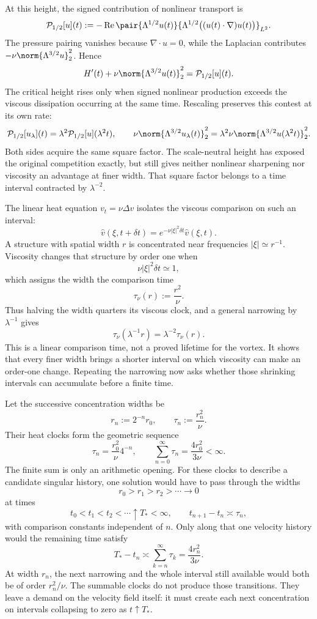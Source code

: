 
At this height, the signed contribution of nonlinear transport is
\[
  \mathcal P_{1/2}[u](t)
  :=
  -\operatorname{Re}
  \pair
    {\Lambda^{1/2}u(t)}
    {\Lambda^{1/2}\bigl((u(t)\cdot\nabla)u(t)\bigr)}_{L^2}.
\]
The pressure pairing vanishes because \(\nabla\cdot u=0\), while the Laplacian contributes \(-\nu\norm{\Lambda^{3/2}u}_2^2\). Hence
\[
  H'(t)
  +
  \nu\norm{\Lambda^{3/2}u(t)}_2^2
  =
  \mathcal P_{1/2}[u](t).
\]
The critical height rises only when signed nonlinear production exceeds the viscous dissipation occurring at the same time. Rescaling preserves this contest at its own rate:
\[
  \mathcal P_{1/2}[u_\lambda](t)
  =
  \lambda^2\mathcal P_{1/2}[u](\lambda^2t),
  \qquad
  \nu\norm{\Lambda^{3/2}u_\lambda(t)}_2^2
  =
  \lambda^2\nu\norm{\Lambda^{3/2}u(\lambda^2t)}_2^2.
\]
Both sides acquire the same square factor. The scale-neutral height has exposed the original competition exactly, but still gives neither nonlinear sharpening nor viscosity an advantage at finer width. That square factor belongs to a time interval contracted by \(\lambda^{-2}\).


The linear heat equation \(v_t=\nu\Delta v\) isolates the viscous comparison on such an interval:
\[
  \widehat v(\xi,t+\delta t)
  =
  e^{-\nu|\xi|^2\delta t}\widehat v(\xi,t).
\]
A structure with spatial width \(r\) is concentrated near frequencies \(|\xi|\simeq r^{-1}\). Viscosity changes that structure by order one when
\[
  \nu|\xi|^2\delta t\simeq1,
\]
which assigns the width the comparison time
\[
  \tau_\nu(r)
  :=
  \frac{r^2}{\nu}.
\]
Thus halving the width quarters its viscous clock, and a general narrowing by \(\lambda^{-1}\) gives
\[
  \tau_\nu(\lambda^{-1}r)
  =
  \lambda^{-2}\tau_\nu(r).
\]
This is a linear comparison time, not a proved lifetime for the vortex. It shows that every finer width brings a shorter interval on which viscosity can make an order-one change. Repeating the narrowing now asks whether those shrinking intervals can accumulate before a finite time.


Let the successive concentration widths be
\[
  r_n:=2^{-n}r_0,
  \qquad
  \tau_n:=\frac{r_n^2}{\nu}.
\]
Their heat clocks form the geometric sequence
\[
  \tau_n
  =
  \frac{r_0^2}{\nu}4^{-n},
  \qquad
  \sum_{n=0}^{\infty}\tau_n
  =
  \frac{4r_0^2}{3\nu}
  <
  \infty.
\]
The finite sum is only an arithmetic opening. For these clocks to describe a candidate singular history, one \NavierStokes{} solution would have to pass through the widths
\[
  r_0>r_1>r_2>\cdots\longrightarrow0
\]
at times
\[
  t_0<t_1<t_2<\cdots\uparrow T_*<\infty,
  \qquad
  t_{n+1}-t_n\asymp\tau_n,
\]
with comparison constants independent of \(n\). Only along that one velocity history would the remaining time satisfy
\[
  T_*-t_n
  \asymp
  \sum_{k=n}^{\infty}\tau_k
  =
  \frac{4r_n^2}{3\nu}.
\]
At width \(r_n\), the next narrowing and the whole interval still available would both be of order \(r_n^2/\nu\). The summable clocks do not produce those transitions. They leave a demand on the velocity field itself: it must create each next concentration on intervals collapsing to zero as \(t\uparrow T_*\).
